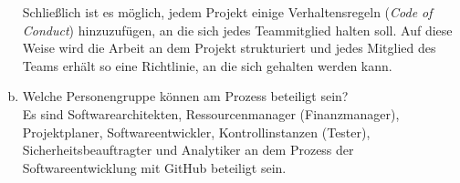 \begin{enumerate}[(a)]
	Schließlich ist es möglich, jedem Projekt einige Verhaltensregeln (\emph{Code of Conduct}) hinzuzufügen, an die sich jedes Teammitglied halten soll. Auf diese Weise wird die Arbeit an dem Projekt strukturiert und jedes Mitglied des Teams erhält so eine Richtlinie, an die sich gehalten werden kann.

	
	\item Welche Personengruppe können am Prozess beteiligt sein? \\
	Es sind Softwarearchitekten, Ressourcenmanager (Finanzmanager), Projektplaner, Softwareentwickler, Kontrollinstanzen (Tester), Sicherheitsbeauftragter und Analytiker an dem Prozess der Softwareentwicklung mit GitHub beteiligt sein.
\end{enumerate}

